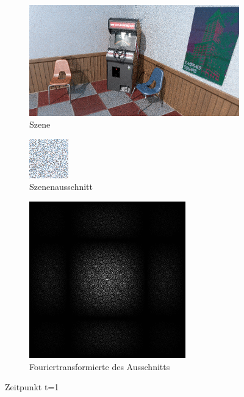 \newpage

\begin{figure}[H]

    \begin{subfigure}{\textwidth}
        \centering \includegraphics[scale=.25]{content/TemporalerAlg/Bilder/Sorting/Screenshots/seed_debug_3.0_selection.png}
        \caption{Szene}
        \label{fig:Nur_Sorting_Szene_t1}
    \end{subfigure}
    \begin{subfigure}{0.5\textwidth}
        \centering \includegraphics[width=0.4\linewidth]{content/TemporalerAlg/Bilder/Sorting/Screenshots/seed_debug_3.0_ausschnitt.png} 
        \caption{Szenenausschnitt}
        \label{fig:Nur_Sorting_ausschnitt_t1}
    \end{subfigure}
    \begin{subfigure}{0.5\textwidth}
        \centering \includegraphics[width=0.4\linewidth]{content/TemporalerAlg/Bilder/Sorting/Screenshots/Spektren/seed_debug_3.0_ausschnitt.png}
        \caption{Fouriertransformierte des Ausschnitts}
        \label{fig:Nur_Sorting_Fouriertransformierte_t1}
    \end{subfigure}
        \caption{Zeitpunkt t=1}
        \label{fig:Nur_Sorting_Verlauf_t1}
\end{figure}

